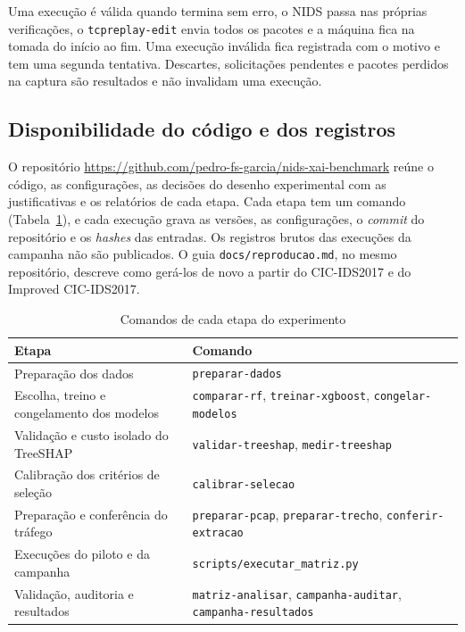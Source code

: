 \documentclass[
  article,
  12pt,
  oneside,
  a4paper,
  english,
  brazil
]{abntex2}
\begin{document}
Uma execução é válida quando termina sem erro, o NIDS passa nas próprias verificações, o
\texttt{tcpreplay-edit} envia todos os pacotes e a máquina fica na tomada do início ao fim. Uma
execução inválida fica registrada com o motivo e tem uma segunda tentativa. Descartes, solicitações
pendentes e pacotes perdidos na captura são resultados e não invalidam uma execução.

\subsection{Disponibilidade do código e dos registros}

O repositório \url{https://github.com/pedro-fs-garcia/nids-xai-benchmark} reúne o código, as
configurações, as decisões do desenho experimental com as justificativas e os relatórios de cada
etapa. Cada etapa
tem um comando (Tabela~\ref{tab:comandos}), e cada execução grava as versões, as configurações, o
\emph{commit} do repositório e os \emph{hashes} das entradas. Os registros brutos das execuções da
campanha não são publicados. O guia \texttt{docs/reproducao.md}, no mesmo repositório, descreve como
gerá-los de novo a partir do CIC-IDS2017 e do Improved CIC-IDS2017.

\begin{table}[htbp]
  \centering
  \caption{Comandos de cada etapa do experimento}
  \label{tab:comandos}
  \begin{tabular}{p{6cm}p{9cm}}
    \toprule
    Etapa & Comando \\
    \midrule
    Preparação dos dados & \texttt{preparar-dados} \\
    Escolha, treino e congelamento dos modelos & \texttt{comparar-rf}, \texttt{treinar-xgboost},
    \texttt{congelar-modelos} \\
    Validação e custo isolado do TreeSHAP & \texttt{validar-treeshap}, \texttt{medir-treeshap} \\
    Calibração dos critérios de seleção & \texttt{calibrar-selecao} \\
    Preparação e conferência do tráfego & \texttt{preparar-pcap}, \texttt{preparar-trecho},
    \texttt{conferir-extracao} \\
    Execuções do piloto e da campanha & \texttt{scripts/executar\_matriz.py} \\
    Validação, auditoria e resultados & \texttt{matriz-analisar}, \texttt{campanha-auditar},
    \texttt{campanha-resultados} \\
    \bottomrule
  \end{tabular}
\end{table}
\end{document}

